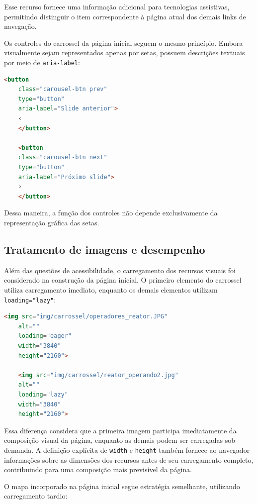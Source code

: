 Esse recurso fornece uma informação adicional para tecnologias assistivas, permitindo distinguir o item correspondente à página atual dos demais links de navegação.

Os controles do carrossel da página inicial seguem o mesmo princípio. Embora visualmente sejam representados apenas por setas, possuem descrições textuais por meio de \texttt{aria-label}:

\begin{lstlisting}[language=HTML, caption={Controles acessíveis do carrossel.}, label={lst:carouselaria}]
	<button
	class="carousel-btn prev"
	type="button"
	aria-label="Slide anterior">
	‹
	</button>
	
	<button
	class="carousel-btn next"
	type="button"
	aria-label="Próximo slide">
	›
	</button>
\end{lstlisting}

Dessa maneira, a função dos controles não depende exclusivamente da representação gráfica das setas.

\vspace{5mm}
\subsection{Tratamento de imagens e desempenho}

Além das questões de acessibilidade, o carregamento dos recursos visuais foi considerado na construção da página inicial. O primeiro elemento do carrossel utiliza carregamento imediato, enquanto os demais elementos utilizam \texttt{loading="lazy"}:

\begin{lstlisting}[language=HTML, caption={Estratégia de carregamento das imagens do carrossel.}, label={lst:lazy}]
	<img src="img/carrossel/operadores_reator.JPG"
	alt=""
	loading="eager"
	width="3840"
	height="2160">
	
	<img src="img/carrossel/reator_operando2.jpg"
	alt=""
	loading="lazy"
	width="3840"
	height="2160">
\end{lstlisting}

Essa diferença considera que a primeira imagem participa imediatamente da composição visual da página, enquanto as demais podem ser carregadas sob demanda. A definição explícita de \texttt{width} e \texttt{height} também fornece ao navegador informações sobre as dimensões dos recursos antes de seu carregamento completo, contribuindo para uma composição mais previsível da página.

O mapa incorporado na página inicial segue estratégia semelhante, utilizando carregamento tardio:

